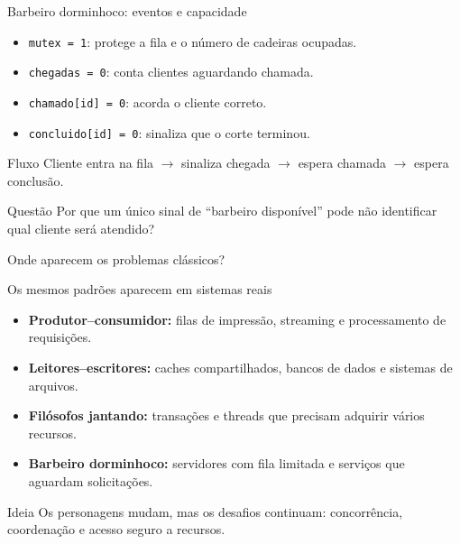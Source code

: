 \documentclass[aspectratio=169,11pt]{beamer}
\begin{document}
\begin{frame}{Barbeiro dorminhoco: eventos e capacidade}
\small
\begin{itemize}
\item \texttt{mutex = 1}: protege a fila e o número de cadeiras ocupadas.
\item \texttt{chegadas = 0}: conta clientes aguardando chamada.
\item \texttt{chamado[id] = 0}: acorda o cliente correto.
\item \texttt{concluido[id] = 0}: sinaliza que o corte terminou.
\end{itemize}
\vspace{0.2cm}
\begin{block}{Fluxo}
Cliente entra na fila $\rightarrow$ sinaliza chegada $\rightarrow$ espera chamada $\rightarrow$ espera conclusão.
\end{block}
\begin{alertblock}{Questão}
Por que um único sinal de ``barbeiro disponível'' pode não identificar qual cliente será atendido?
\end{alertblock}
\end{frame}


\begin{frame}{Onde aparecem os problemas clássicos?}
\small
\begin{block}{Os mesmos padrões aparecem em sistemas reais}
\begin{itemize}
\item \textbf{Produtor--consumidor:} filas de impressão, streaming e processamento de requisições.
\item \textbf{Leitores--escritores:} caches compartilhados, bancos de dados e sistemas de arquivos.
\item \textbf{Filósofos jantando:} transações e threads que precisam adquirir vários recursos.
\item \textbf{Barbeiro dorminhoco:} servidores com fila limitada e serviços que aguardam solicitações.
\end{itemize}
\end{block}
\begin{alertblock}{Ideia}
Os personagens mudam, mas os desafios continuam: concorrência, coordenação e acesso seguro a recursos.
\end{alertblock}
\end{frame}
\end{document}
